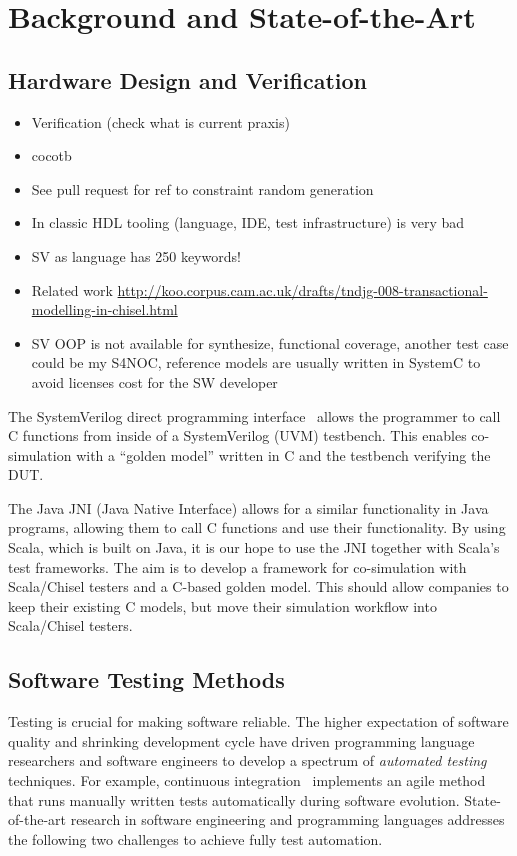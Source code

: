 \documentclass[fleqn,12pt]{article}
\begin{document}
\section{Background and State-of-the-Art}
\label{sec:background}


\subsection{Hardware Design and Verification}

\begin{itemize}
\item Verification (check what is current praxis)
\item cocotb
\item See pull request for ref to constraint random generation
\item In classic HDL tooling (language, IDE, test infrastructure) is very bad
\item SV as language has 250 keywords!
\item Related work \url{http://koo.corpus.cam.ac.uk/drafts/tndjg-008-transactional-modelling-in-chisel.html}
\item SV OOP is not available for synthesize, functional coverage, another test case could be my S4NOC, reference models are usually written in SystemC to avoid licenses cost for the SW developer
\end{itemize}

The SystemVerilog direct programming interface~\cite{Doulos:SV:dpi} allows the programmer to call
C functions from inside of a SystemVerilog (UVM) testbench.
This enables co-simulation with a ``golden model'' written in C and the
testbench verifying the DUT.

The Java JNI (Java Native Interface) allows for a similar functionality in Java programs,
allowing them to call C functions and use their functionality.
By using Scala, which is built on Java, it is our hope to use the JNI together with Scala's test frameworks.
The aim is to develop a framework for co-simulation with Scala/Chisel testers and a
C-based golden model. This should allow companies to keep their existing C models,
but move their simulation workflow into Scala/Chisel testers.


\subsection{Software Testing Methods}
Testing is crucial for making software reliable. The higher
expectation of software quality and shrinking development cycle have
driven programming language researchers and software engineers to
develop a spectrum of \emph{automated testing} techniques. For
example, continuous integration~\cite{duvall2007continuous} implements
an agile method that runs manually written tests automatically during
software evolution.  State-of-the-art research in software engineering
and programming languages addresses the following two challenges to
achieve fully test automation.
\end{document}
